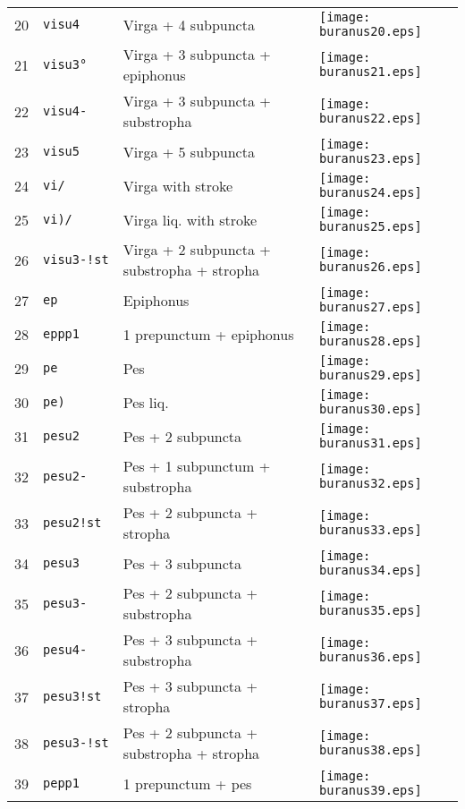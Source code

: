 \documentclass{scrarticle}
\begin{document}
\begin{longtable}{l|l|l|l}
20 & \texttt{visu4} & Virga + 4 subpuncta & \texttt{[image: buranus20.eps]} \\
21 & \texttt{visu3°} & Virga + 3 subpuncta + epiphonus & \texttt{[image: buranus21.eps]} \\
22 & \texttt{visu4-} & Virga + 3 subpuncta + substropha & \texttt{[image: buranus22.eps]} \\
23 & \texttt{visu5} & Virga + 5 subpuncta & \texttt{[image: buranus23.eps]} \\
24 & \texttt{vi/} & Virga with stroke & \texttt{[image: buranus24.eps]} \\
25 & \texttt{vi)/} & Virga liq. with stroke & \texttt{[image: buranus25.eps]} \\
26 & \texttt{visu3-!st} & Virga + 2 subpuncta + substropha + stropha & \texttt{[image: buranus26.eps]} \\
27 & \texttt{ep} & Epiphonus & \texttt{[image: buranus27.eps]} \\
28 & \texttt{eppp1} & 1 prepunctum + epiphonus & \texttt{[image: buranus28.eps]} \\
29 & \texttt{pe} & Pes & \texttt{[image: buranus29.eps]} \\
30 & \texttt{pe)} & Pes liq. & \texttt{[image: buranus30.eps]} \\
31 & \texttt{pesu2} & Pes + 2 subpuncta & \texttt{[image: buranus31.eps]} \\
32 & \texttt{pesu2-} & Pes + 1 subpunctum + substropha & \texttt{[image: buranus32.eps]} \\
33 & \texttt{pesu2!st} & Pes + 2 subpuncta + stropha & \texttt{[image: buranus33.eps]} \\
34 & \texttt{pesu3} & Pes + 3 subpuncta & \texttt{[image: buranus34.eps]} \\
35 & \texttt{pesu3-} & Pes + 2 subpuncta + substropha & \texttt{[image: buranus35.eps]} \\
36 & \texttt{pesu4-} & Pes + 3 subpuncta + substropha & \texttt{[image: buranus36.eps]} \\
37 & \texttt{pesu3!st} & Pes + 3 subpuncta + stropha & \texttt{[image: buranus37.eps]} \\
38 & \texttt{pesu3-!st} & Pes + 2 subpuncta + substropha + stropha & \texttt{[image: buranus38.eps]} \\
39 & \texttt{pepp1} & 1 prepunctum + pes & \texttt{[image: buranus39.eps]} \\

\end{longtable}
\end{document}
